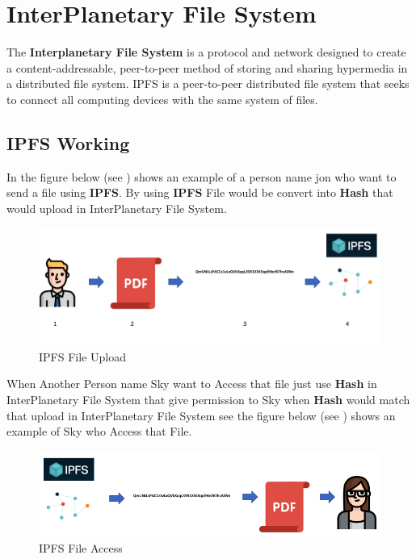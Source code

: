 \chapter{InterPlanetary File System
	\label{ch:InterPlanetary File System}}

The \textbf{Interplanetary File System} is a protocol and network designed to create a content-addressable, peer-to-peer method of storing and sharing hypermedia in a distributed file system. IPFS is a peer-to-peer distributed file system that seeks to connect all computing devices with the same system of files.
\section{IPFS Working}
In the figure below (see ) shows an example of a person name jon who want to send a file using \textbf{IPFS}. By using \textbf{IPFS} File would be convert into \textbf{Hash} that would upload in InterPlanetary File System. 


\begin{figure}[h]
	\centering
	\includegraphics[width=450px]{figures/IPFS/10.png}
	\caption{IPFS File Upload}
	\label{fig:ipfs1}
\end{figure}

When Another Person name Sky want to Access that file just use \textbf{Hash} in InterPlanetary File System that give permission to Sky 
when \textbf{Hash} would match that upload in InterPlanetary File System see  the figure below (see ) shows an example of Sky who Access that File.

\begin{figure}[h]
	\centering
	\includegraphics[width=450px]{figures/IPFS/11.png}
	\caption{IPFS File Access}
	\label{fig:ipfs2}
\end{figure}

